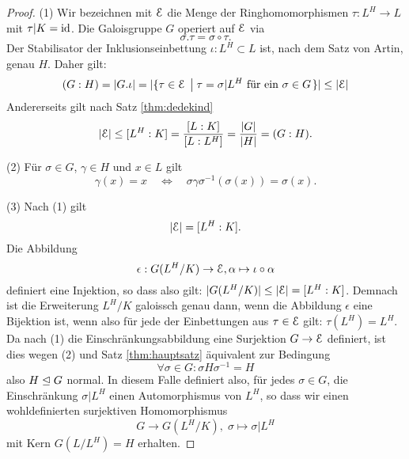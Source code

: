 \documentclass{book}
\begin{document}
\begin{proof}
    (1) Wir bezeichnen mit $\EuScript{E}$ die Menge der Ringhomomorphismen $\tau: L^H \to L$
    mit $\tau|K = \operatorname{id}$. Die Galoisgruppe $G$ operiert auf $\EuScript{E}$ via
    \[
        \sigma.\tau = \sigma \circ \tau.
    \]
    Der Stabilisator der Inklusionseinbettung $\iota: L^H \subset L$ ist, nach dem
    Satz von Artin, genau $H$. Daher gilt:
    \[
        (G:H) = |G.\iota| = |\{\tau \in \EuScript{E}\; \left| \; \text{$\tau = \sigma|L^H$ für ein $\sigma \in G$} \right. \}| \le |\EuScript{E}|
    \]
    Andererseits gilt nach Satz \ref{thm:dedekind} 
    \[
        |\EuScript{E}| \le [L^H:K] = \frac{[L:K]}{[L:L^H]} = \frac{|G|}{|H|} = (G:H).
    \]

    \noindent
    (2) Für $\sigma \in G$, $\gamma \in H$ und $x \in L$ gilt
    \[
        \gamma(x) = x \quad \iff \quad \sigma\gamma\sigma^{-1}(\sigma(x)) = \sigma(x).
    \]

    \noindent
    (3) Nach (1) gilt
    \[
        |\EuScript{E}| = [L^H:K].
    \]
    Die Abbildung
    \[
        \epsilon:  G(L^H/K) \to \EuScript{E}, \alpha \mapsto \iota \circ \alpha
    \]
    definiert eine Injektion, so dass also gilt: $|G(L^H/K)| \le |\EuScript{E}| = [L^H:K]$. Demnach ist die Erweiterung $L^H/K$
    galoissch genau dann, wenn die Abbildung $\epsilon$ eine Bijektion
    ist, wenn also für jede der Einbettungen aus $\tau \in \EuScript{E}$ gilt: $\tau(L^H)
    = L^H$. Da nach (1) die Einschränkungsabbildung eine Surjektion $G \to \EuScript{E}$
    definiert, ist dies wegen (2) und Satz \ref{thm:hauptsatz} äquivalent zur Bedingung
    \[
        \forall \sigma \in G: \sigma H \sigma^{-1} = H
    \]
    also $H \trianglelefteq G$ normal. In diesem Falle definiert also, für jedes $\sigma \in
    G$, die Einschränkung $\sigma|L^H$ einen Automorphismus von $L^H$, so dass
    wir einen wohldefinierten surjektiven Homomorphismus 
    \[
        G \to G(L^H/K), \; \sigma \mapsto \sigma|L^H
    \]
    mit Kern $G(L/L^H) = H$ erhalten.
\end{proof}
\end{document}
